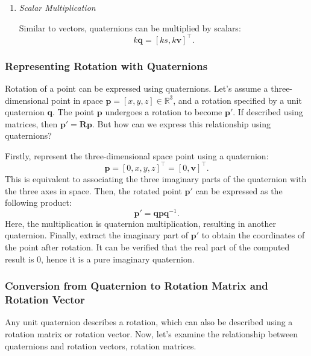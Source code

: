 \begin{enumerate}
	\item \emph{Scalar Multiplication}
	
	Similar to vectors, quaternions can be multiplied by scalars:
	\begin{equation}
		k \mathbf{q} = \left[ ks, k\mathbf{v} \right]^\top.
	\end{equation}
\end{enumerate}


\subsubsection{Representing Rotation with Quaternions}
Rotation of a point can be expressed using quaternions. Let's assume a three-dimensional point in space $\mathbf{p} = [x,y,z]\in \mathbb{R}^3$, and a rotation specified by a unit quaternion $\mathbf{q}$. The point $\mathbf{p}$ undergoes a rotation to become $\mathbf{p}'$. If described using matrices, then $\mathbf{p}'=\mathbf{R} \mathbf{p}$. But how can we express this relationship using quaternions?

Firstly, represent the three-dimensional space point using a quaternion:
\begin{equation}
\mathbf{p} = [0, x, y, z]^\top = [0, \mathbf{v}]^\top.
\end{equation}
This is equivalent to associating the three imaginary parts of the quaternion with the three axes in space. Then, the rotated point $\mathbf{p}'$ can be expressed as the following product:
\begin{equation}\label{eq:rotate-with-quaternion}
	\mathbf{p}' = \mathbf{q} \mathbf{p} \mathbf{q}^{-1}.
\end{equation}
Here, the multiplication is quaternion multiplication, resulting in another quaternion. Finally, extract the imaginary part of $\mathbf{p}'$ to obtain the coordinates of the point after rotation. It can be verified that the real part of the computed result is 0, hence it is a pure imaginary quaternion.

\subsubsection{Conversion from Quaternion to Rotation Matrix and Rotation Vector}
Any unit quaternion describes a rotation, which can also be described using a rotation matrix or rotation vector. Now, let's examine the relationship between quaternions and rotation vectors, rotation matrices.

